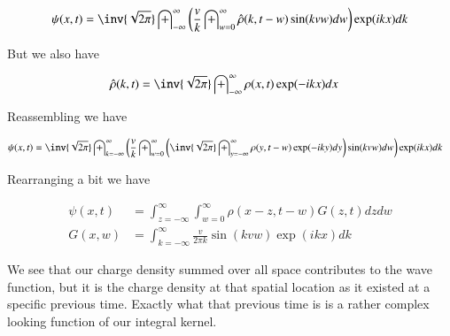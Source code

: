 \documentclass{article}
\newcommand{\IIinf}[0]{ \int_{-\infty}^\infty }
\begin{document}
\begin{align*}
{\psi}(x, t)
&=
\inv{\sqrt{2\pi}} \IIinf
\left(
\frac{v}{k} \int_{w = 0}^\infty \hat{\rho}(k, t-w) \sin( k v w ) dw
\right) \exp( i k x ) dk \\
\end{align*}


But we also have

\begin{align*}
\hat{\rho}(k,t) &= \inv{\sqrt{2\pi}} \int_{-\infty}^\infty {\rho}(x, t) \exp( -i k x ) dx
\end{align*}

Reassembling we have


\begin{align*}
{\psi}(x, t)
&=
\inv{\sqrt{2\pi}}
\int_{k = -\infty}^\infty
\left(
\frac{v}{k}
\int_{w = 0}^\infty
\left(
\inv{\sqrt{2\pi}} \int_{y=-\infty}^\infty {\rho}(y, t-w) \exp( -i k y ) dy
\right)
\sin( k v w ) dw
\right) \exp( i k x ) dk
\end{align*}

Rearranging a bit we have

\begin{align}
{\psi}(x, t)
&=
%
%
\int_{z=-\infty}^\infty
\int_{w = 0}^\infty
{\rho}(x-z, t-w) G(z, t) dz dw \\
G(x, w) &=
\int_{k = -\infty}^\infty
\frac{v}{2\pi k}
\sin( k v w )
\exp( i k x )
dk
\end{align}

We see that our charge density summed over all space contributes to the wave function, but it is the charge density at that spatial location as it existed at a specific previous time.
Exactly what that previous time is is a rather complex looking function of our integral kernel.

\end{document}
